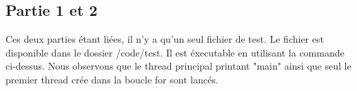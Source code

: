 \documentclass[a4paper]{article}
\begin{document}
\subsection{Partie 1 et 2}

Ces deux parties étant liées, il n'y a qu'un seul fichier de test. Le fichier
est disponible dans le dossier /code/test. Il est éxecutable en utilisant la
commande ci-dessus. Nous observons que le thread principal printant "main" ainsi
que seul le premier thread crée dans la boucle for sont lancés.


\end{document}
